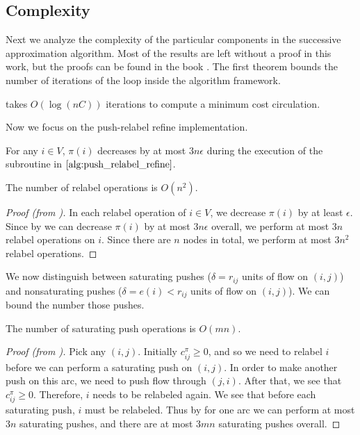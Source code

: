 \subsection{Complexity}

Next we analyze the complexity of the particular components in the successive approximation algorithm.
Most of the results are left without a proof in this work, but the proofs can be found in the book \cite{williamson2019}.
The first theorem bounds the number of iterations of the loop inside the algorithm framework.

\begin{theorem}\label{thm:succ_approx_framework}
     takes $O(\log(nC))$ iterations to compute a minimum cost circulation.
\end{theorem}

Now we focus on the push-relabel refine implementation.

\begin{lemma} \label{lem:potential_decrease_bound}
    For any $i \in V$, $\pi(i)$ decreases by at most $3n\epsilon$ during the execution of the subroutine in $\Cref{alg:push_relabel_refine}$.
\end{lemma}

\begin{lemma}
    The number of relabel operations is $O(n^2)$.
\end{lemma}
\begin{proof}[Proof (from {\cite[p.~138]{williamson2019}})]
    In each relabel operation of $i\in V$, we decrease $\pi(i)$ by at least $\epsilon$. Since by  we can decrease $\pi(i)$ by at most $3n\epsilon$ overall, we perform at most $3n$ relabel operations on $i$. Since there are $n$ nodes in total, we perform at most $3n^2$ relabel operations.
\end{proof}

We now distinguish between saturating pushes ($\delta = r_{ij}$ units of flow on $(i,j)$) and nonsaturating
pushes ($\delta = e(i) < r_{ij}$ units of flow on $(i,j)$). We can bound the number those pushes.
\begin{lemma}
\label{lem:push_relabel_saturating}
    The number of saturating push operations is $O(mn)$.
\end{lemma}

\begin{proof}[Proof (from {\cite[p.~139]{williamson2019}})]
    Pick any $(i,j)$. Initially $c^\pi_{ij} \geq 0$, and so we need to relabel $i$ before we can perform a saturating push on $(i,j)$. In order to make another push on this arc, we need to push flow through $(j,i)$. After that, we see that $c_{ij}^\pi \geq 0$. Therefore, $i$ needs to be relabeled again. We see that before each saturating push, $i$ must be relabeled. Thus by  for one arc we can perform at most $3n$ saturating pushes, and there are at most $3mn$ saturating pushes overall.
\end{proof}

